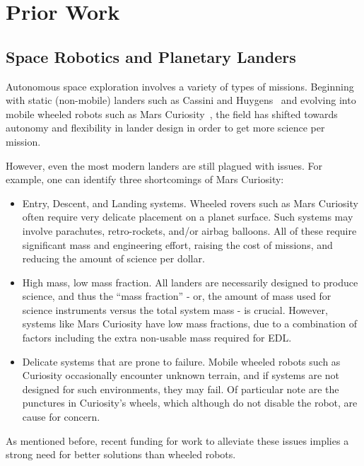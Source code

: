 \documentclass[12pt]{report}
\begin{document}
\section{Prior Work}

\subsection{Space Robotics and Planetary Landers}

Autonomous space exploration involves a variety of types of missions.
Beginning with static (non-mobile) landers such as Cassini and Huygens~\cite{matson2003cassini} and evolving into mobile wheeled robots such as Mars Curiosity~\cite{grotzinger2012mars}, the field has shifted towards autonomy and flexibility in lander design in order to get more science per mission.

However, even the most modern landers are still plagued with issues.
For example, one can identify three shortcomings of Mars Curiosity:

\begin{itemize}
  \setlength{\itemsep}{0cm}%
  \setlength{\parskip}{0cm}%
  \item Entry, Descent, and Landing systems. Wheeled rovers such as Mars Curiosity often require very delicate placement on a planet surface. Such systems may involve parachutes, retro-rockets, and/or airbag balloons. All of these require significant mass and engineering effort, raising the cost of missions, and reducing the amount of science per dollar.~\cite{Vytas_IPPW_2013,NIACfinalreport}
  \item High mass, low mass fraction. All landers are necessarily designed to produce science, and thus the ``mass fraction'' - or, the amount of mass used for science instruments versus the total system mass - is crucial. However, systems like Mars Curiosity have low mass fractions, due to a combination of factors including the extra non-usable mass required for EDL.~\cite{Vytas_IPPW_2013,NIACfinalreport}
  \item Delicate systems that are prone to failure. Mobile wheeled robots such as Curiosity occasionally encounter unknown terrain, and if systems are not designed for such environments, they may fail. Of particular note are the punctures in Curiosity's wheels, which although do not disable the robot, are cause for concern.~\cite{Vytas_IPPW_2013,NIACfinalreport}
\end{itemize}

As mentioned before, recent funding for work to alleviate these issues implies a strong need for better solutions than wheeled robots.
\end{document}
